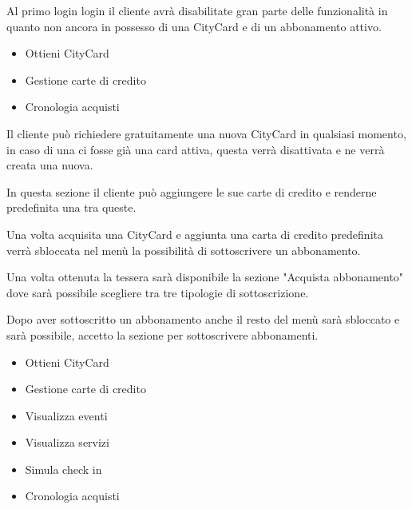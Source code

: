 \begin{center}
\end{center}
Al primo login login il cliente avrà disabilitate gran parte delle funzionalità in quanto non ancora in possesso di una CityCard e di un abbonamento attivo.
\begin{itemize}
    \item Ottieni CityCard
    \item Gestione carte di credito
    \item Cronologia acquisti
\end{itemize}
\begin{center}
\end{center}
\begin{center}
\end{center}
Il cliente può richiedere gratuitamente una nuova CityCard in qualsiasi momento, in caso di una ci fosse già una card attiva, questa verrà disattivata e ne verrà creata una nuova.
\begin{center}
\end{center}
In questa sezione il cliente può aggiungere le sue carte di credito e renderne predefinita una tra queste.
\begin{center}
\end{center}
Una volta acquisita una CityCard e aggiunta una carta di credito predefinita verrà sbloccata nel menù la possibilità di sottoscrivere un abbonamento.
\begin{center}
\end{center}
Una volta ottenuta la tessera sarà disponibile la sezione "Acquista abbonamento" dove sarà possibile scegliere tra tre tipologie di sottoscrizione.
\begin{center}
\end{center}
Dopo aver sottoscritto un abbonamento anche il resto del menù sarà sbloccato e sarà possibile, accetto la sezione per sottoscrivere abbonamenti.
\begin{itemize}
    \item Ottieni CityCard
    \item Gestione carte di credito
    \item Visualizza eventi
    \item Visualizza servizi
    \item Simula check in
    \item Cronologia acquisti
\end{itemize}

